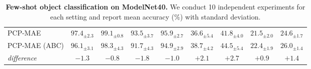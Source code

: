 \begin{table}
\begin{center}
\begin{tabular}{l|cccc|cccc}
\midrule
PCP-MAE~\cite{pcpmae} & $97.4_{\pm 2.3}$ & $99.1_{\pm 0.8}$ & $93.5_{\pm 3.7}$ & $95.9_{\pm 2.7}$ & $36.6_{\pm 5.4}$ & $41.8_{\pm 4.0}$ & $21.5_{\pm 2.0}$ & $24.6_{\pm 1.7}$\\
PCP-MAE (ABC) & $96.1_{\pm 3.1}$ & $98.3_{\pm 4.3}$ & $91.7_{\pm 4.3}$ & $94.9_{\pm 2.9}$ & $38.7_{\pm 4.2}$ & $44.5_{\pm 5.4}$ & $22.4_{\pm 1.9}$ & $26.0_{\pm 1.4}$\\
\textit{difference} & \cellcolor{orange!25}$-1.3$ & \cellcolor{orange!25}$-0.8$ & \cellcolor{orange!25}$-1.8$ & \cellcolor{orange!25}$-1.0$ & \cellcolor{green!25}$+2.1$ & \cellcolor{green!25}$+2.7$ & \cellcolor{green!25}$+0.9$ & \cellcolor{green!25}$+1.4$ \\

\bottomrule
\end{tabular}
\caption{{\bf Few-shot object classification on ModelNet40.} We conduct 10 independent experiments for each setting and report mean accuracy (\%) with standard deviation.}
\setlength\tabcolsep{2pt}
\label{tb:few}
\end{center}

\end{table}